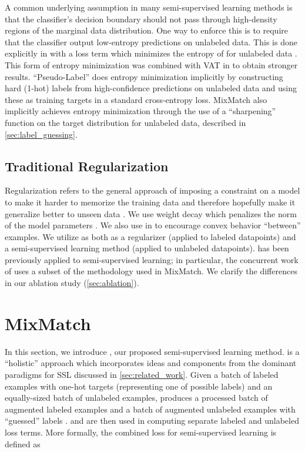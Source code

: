 \documentclass{article}
\begin{document}
A common underlying assumption in many semi-supervised learning methods is that the classifier's decision boundary should not pass through high-density regions of the marginal data distribution.
One way to enforce this is to require that the classifier output low-entropy predictions on unlabeled data.
This is done explicitly in \cite{grandvalet2005semi} with a loss term which minimizes the entropy of  for unlabeled data .
This form of entropy minimization was combined with VAT in \cite{miyato2018virtual} to obtain stronger results.
``Pseudo-Label'' \cite{lee2013pseudo} does entropy minimization implicitly by constructing hard (1-hot) labels from high-confidence predictions on unlabeled data and using these as training targets in a standard cross-entropy loss.
MixMatch also implicitly achieves entropy minimization through the use of a ``sharpening'' function on the target distribution for unlabeled data, described in \cref{sec:label_guessing}.

\subsection{Traditional Regularization}
Regularization refers to the general approach of imposing a constraint on a model to make it harder to memorize the training data and therefore hopefully make it generalize better to unseen data \cite{hinton1993keeping}.
We use weight decay which penalizes the  norm of the model parameters \cite{loshchilov2017fixing,zhang2018three}.
We also use  \cite{zhang2017mixup} in  to encourage convex behavior ``between'' examples.
We utilize  as both as a regularizer (applied to labeled datapoints) and a semi-supervised learning method (applied to unlabeled datapoints).
 has been previously applied to semi-supervised learning; in particular, the concurrent work of \cite{verma2019interpolation} uses a subset of the methodology used in MixMatch.
We clarify the differences in our ablation study (\cref{sec:ablation}).

\section{MixMatch}
\label{sec:mixmatch}

In this section, we introduce , our proposed semi-supervised learning method.
 is a ``holistic'' approach which incorporates ideas and components from the dominant paradigms for SSL discussed in \cref{sec:related_work}.
Given a batch  of labeled examples with one-hot targets (representing one of  possible labels) and an equally-sized batch  of unlabeled examples,  produces a processed batch of augmented labeled examples  and a batch of augmented unlabeled examples with ``guessed'' labels .
 and  are then used in computing separate labeled and unlabeled loss terms.
More formally, the combined loss  for semi-supervised learning is defined as
\end{document}
